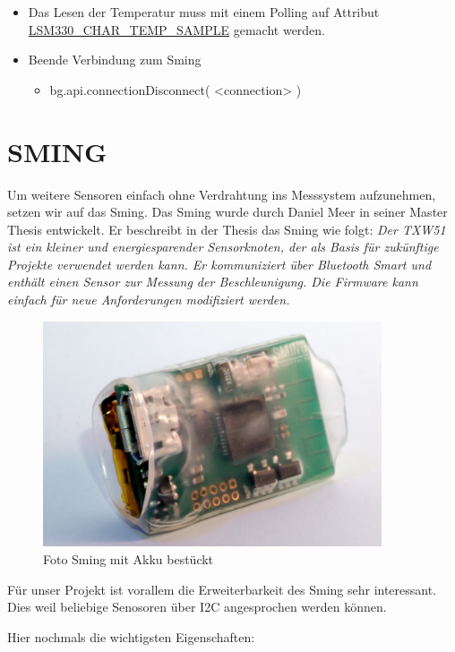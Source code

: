 \begin{itemize}
\begin{itemize}
	\item Das Lesen der Temperatur muss mit einem Polling auf Attribut \url{LSM330_CHAR_TEMP_SAMPLE} gemacht werden.

	\item Beende Verbindung zum Sming
			\begin{itemize}
				\itemsep 1pt \parskip 0pt \parsep 0pt
				\item bg.api.connectionDisconnect( <connection> )
			\end{itemize}
	\end{itemize}
\end{itemize}


\chapter{SMING}\label{sec:sming}
Um weitere Sensoren einfach ohne Verdrahtung ins Messsystem aufzunehmen, setzen wir auf das Sming. Das Sming wurde durch Daniel Meer in seiner Master Thesis entwickelt. Er beschreibt in der Thesis das Sming wie folgt: \textit{Der TXW51 ist ein kleiner und energiesparender Sensorknoten, der als Basis für zukünftige Projekte verwendet werden kann. Er kommuniziert über Bluetooth Smart und enthält einen Sensor zur Messung der Beschleunigung. Die Firmware kann einfach für neue Anforderungen modifiziert werden.}\cite{meer:masterthesis}

\begin{figure}[hbtp]
	\center
	\includegraphics[width=10cm]{bilder/foto-6.jpg}
	\caption{Foto Sming mit Akku bestückt}
	\label{fig:sming}
\end{figure}

Für unser Projekt ist vorallem die Erweiterbarkeit des Sming sehr interessant. Dies weil beliebige Senosoren über I2C angesprochen werden können.

Hier nochmals die wichtigsten Eigenschaften:

